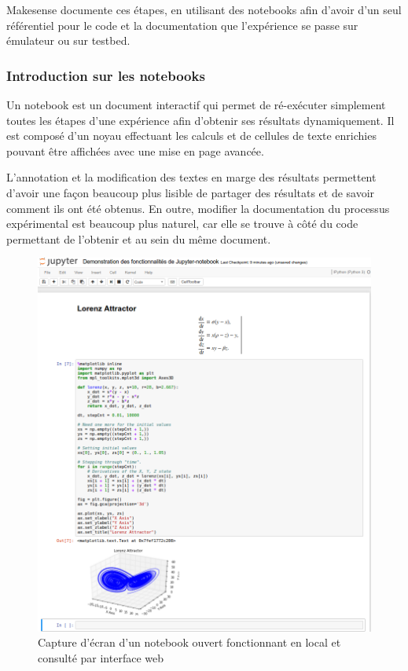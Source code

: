 Makesense documente ces étapes, en utilisant des notebooks afin d'avoir d'un seul référentiel pour le code et la documentation que l'expérience se passe sur émulateur ou sur testbed.

\subsubsection{Introduction sur les notebooks}

Un notebook est un document interactif qui permet de ré-exécuter simplement toutes les étapes d'une expérience afin d'obtenir ses résultats dynamiquement. 
Il est composé d'un noyau effectuant les calculs et de cellules de texte enrichies pouvant être affichées avec une mise en page avancée.

L'annotation et la modification des textes en marge des résultats permettent d'avoir une façon beaucoup plus lisible de partager des résultats et de savoir comment ils ont été obtenus.
En outre, modifier la documentation du processus expérimental est beaucoup plus naturel, car elle se trouve à côté du code permettant de l'obtenir et au sein du même document.

\begin{figure}[ht]
  \centering
  \includegraphics[width=.8\textwidth]{img/jupyter_demo2.png}
  \caption{Capture d'écran d'un notebook ouvert fonctionnant en local et consulté par interface web}
  \label{makesense:fig:demo}
\end{figure}


